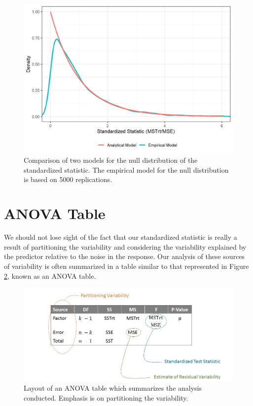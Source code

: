 \documentclass[
]{book}
\theoremstyle{plain}
\theoremstyle{mydefn}
\theoremstyle{myexmpl}
\theoremstyle{remark}
\begin{document}
\begin{figure}

{\centering \includegraphics[width=0.8\linewidth]{./Images/anovateststat-compare-nulls-1} 

}

\caption{Comparison of two models for the null distribution of the standardized statistic.  The empirical model for the null distribution is based on 5000 replications.}\label{fig:anovateststat-compare-nulls}
\end{figure}

\hypertarget{anova-table}{%
\section{ANOVA Table}\label{anova-table}}

We should not lose sight of the fact that our standardized statistic is really a result of partitioning the variability and considering the variability explained by the predictor relative to the noise in the response. Our analysis of these sources of variability is often summarized in a table similar to that represented in Figure \ref{fig:anovateststat-ANOVA-Table}, known as an ANOVA table.

\begin{figure}

{\centering \includegraphics[width=0.8\linewidth]{./images/ANOVAteststat-Table} 

}

\caption{Layout of an ANOVA table which summarizes the analysis conducted.  Emphasis is on partitioning the variability.}\label{fig:anovateststat-ANOVA-Table}
\end{figure}
\end{document}
